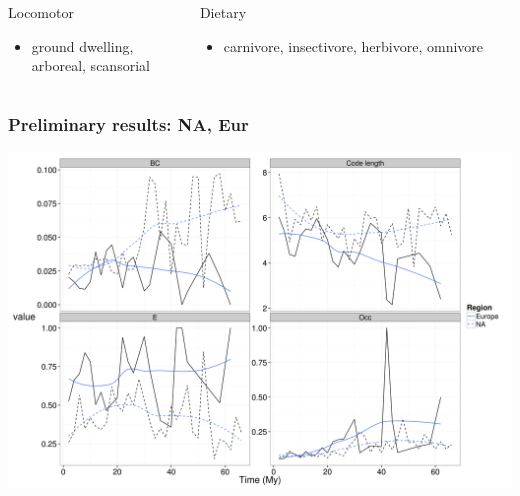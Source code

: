 \documentclass{beamer}
\begin{document}
\begin{frame}
  \vspace{0.2cm}

  \begin{columns}
    \begin{column}{0.5\textwidth}
      Locomotor
      \begin{itemize}
        \item ground dwelling, \\arboreal, scansorial
      \end{itemize}
    \end{column}
    \begin{column}{0.5\textwidth}
      Dietary
      \begin{itemize}
        \item carnivore, insectivore, herbivore, omnivore
      \end{itemize}
    \end{column}
  \end{columns}
\end{frame}

\begin{frame}
  \frametitle{Preliminary results: NA, Eur}

  \begin{center}
    \includegraphics[height = 0.8\textheight, width = \textwidth, keepaspectratio = true]{figure/gen_bin}
  \end{center}
\end{frame}
\end{document}
